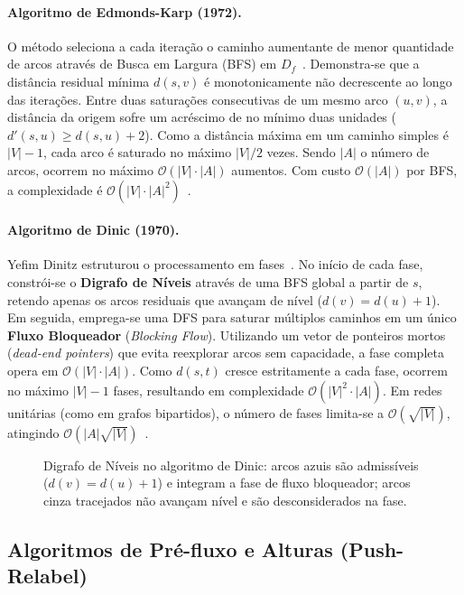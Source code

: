 \paragraph{Algoritmo de Edmonds-Karp (1972).} O método seleciona a cada iteração o caminho aumentante de menor quantidade de arcos através de Busca em Largura (BFS) em $D_f$~\cite{edmonds1972theoretical}. Demonstra-se que a distância residual mínima $d(s, v)$ é monotonicamente não decrescente ao longo das iterações. Entre duas saturações consecutivas de um mesmo arco $(u, v)$, a distância da origem sofre um acréscimo de no mínimo duas unidades ($d'(s, u) \ge d(s, u) + 2$). Como a distância máxima em um caminho simples é $|V|-1$, cada arco é saturado no máximo $|V|/2$ vezes. Sendo $|A|$ o número de arcos, ocorrem no máximo $\mathcal{O}(|V| \cdot |A|)$ aumentos. Com custo $\mathcal{O}(|A|)$ por BFS, a complexidade é $\mathcal{O}(|V| \cdot |A|^2)$~\cite{korte2018combinatorial}.

\paragraph{Algoritmo de Dinic (1970).} Yefim Dinitz estruturou o processamento em fases~\cite{dinic1970algorithm}. No início de cada fase, constrói-se o \textbf{Digrafo de Níveis} através de uma BFS global a partir de $s$, retendo apenas os arcos residuais que avançam de nível ($d(v) = d(u) + 1$). Em seguida, emprega-se uma DFS para saturar múltiplos caminhos em um único \textbf{Fluxo Bloqueador} (\textit{Blocking Flow}). Utilizando um vetor de ponteiros mortos (\textit{dead-end pointers}) que evita reexplorar arcos sem capacidade, a fase completa opera em $\mathcal{O}(|V| \cdot |A|)$. Como $d(s, t)$ cresce estritamente a cada fase, ocorrem no máximo $|V|-1$ fases, resultando em complexidade $\mathcal{O}(|V|^2 \cdot |A|)$. Em redes unitárias (como em grafos bipartidos), o número de fases limita-se a $\mathcal{O}(\sqrt{|V|})$, atingindo $\mathcal{O}(|A|\sqrt{|V|})$~\cite{ahuja1993network}.

\begin{figure}[!ht]
\centering

\caption{Digrafo de Níveis no algoritmo de Dinic: arcos azuis são admissíveis ($d(v) = d(u)+1$) e integram a fase de fluxo bloqueador; arcos cinza tracejados não avançam nível e são desconsiderados na fase.}
\label{fig:grafo_niveis}
\end{figure}

\subsection{Algoritmos de Pré-fluxo e Alturas (Push-Relabel)}

